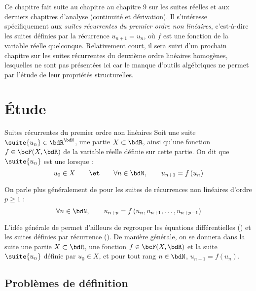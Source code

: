 \documentclass[a4paper,french,bookmarks]{article}
\begin{document}

Ce chapitre fait suite au chapitre au chapitre 9 sur les suites réelles et aux derniers chapitres d'analyse (continuité et dérivation). Il s'intéresse spécifiquement aux \textit{suites récurrentes du premier ordre non linéaires}, c'est-à-dire les suites définies par la récurrence $u_{n+1} = u_n$, où $f$ est une fonction de la variable réelle quelconque. Relativement court, il sera suivi d'un prochain chapitre sur les suites récurrentes du deuxième ordre linéaires homogènes, lesquelles ne sont pas présentées ici car le manque d'outils algébriques ne permet par l'étude de leur propriétés structurelles.

\initcours{}

\section{Étude}

\begin{definition}{Suites récurrentes du premier ordre non linéaires}{}
    Soit une suite $\suite{u_n} \in \bdR^\bdN$, une partie $X \subset \bdR$, ainsi qu'une fonction $f \in \bcF(X, \bdR)$ de la variable réelle définie sur cette partie. On dit que $\suite{u_n}$ est une  lorsque :
    \[ u_0 \in X \qquad\et\qquad \forall n \in \bdN,\qquad u_{n+1} = f\left(u_n\right)\]
\end{definition}

On parle plus généralement de \textit{} pour les suites de récurrences non linéaires d'ordre $p \geq 1$ :
%
\[\forall n \in \bdN,\qquad u_{n+p} = f\left(u_n, u_{n+1}, \dots, u_{n+p-1}\right)\]

L'idée générale de  permet d'ailleurs de regrouper les équations différentielles () et les suites définies par récurrence (). De manière générale, on se donnera dans la suite une partie $X \subset \bdR$, une fonction $f \in \bcF(X, \bdR)$ et la suite $\suite{u_n}$ définie par $u_0 \in X$, et pour tout rang $n \in \bdN$, $u_{n+1} = f(u_n)$.
%

\subsection{Problèmes de définition}
\end{document}

